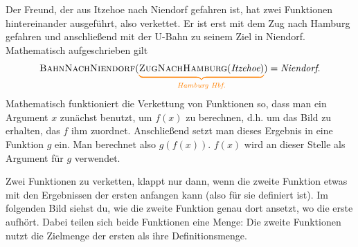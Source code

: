 \documentclass[../../main.tex]{subfiles}
\begin{document}
\begin{example}{}
    Der Freund, der aus Itzehoe nach Niendorf gefahren ist, hat zwei Funktionen hintereinander ausgeführt, also verkettet. Er ist erst mit dem Zug nach Hamburg gefahren und anschließend mit der U-Bahn zu seinem Ziel in Niendorf. Mathematisch aufgeschrieben gilt \[\textsc{BahnNachNiendorf}(\colorbrace{\textsc{ZugNachHamburg}(\emph{Itzehoe})}{\emph{Hamburg Hbf.}})=\emph{Niendorf}.\]
\end{example}

Mathematisch funktioniert die Verkettung von Funktionen so, dass man ein Argument $x$ zunächst benutzt, um $f(x)$ zu berechnen, d.h. um das Bild zu erhalten, das $f$ ihm zuordnet. Anschließend setzt man dieses Ergebnis in eine Funktion $g$ ein. Man berechnet also $g(f(x))$. $f(x)$ wird an dieser Stelle als Argument für $g$ verwendet.

Zwei Funktionen zu verketten, klappt nur dann, wenn die zweite Funktion etwas mit den Ergebnissen der ersten anfangen kann (also für sie definiert ist). Im folgenden Bild siehst du, wie die zweite Funktion genau dort ansetzt, wo die erste aufhört. Dabei teilen sich beide Funktionen eine Menge: Die zweite Funktionen nutzt die Zielmenge der ersten als ihre Definitionsmenge.

\end{document}
